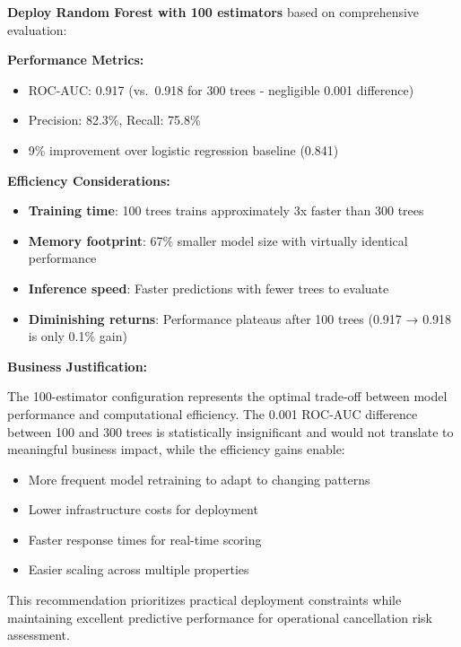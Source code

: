 \documentclass[
  letterpaper,
  DIV=11,
  numbers=noendperiod]{scrartcl}
\providecommand{\tightlist}{%
  \setlength{\itemsep}{0pt}\setlength{\parskip}{0pt}}
\begin{document}
\textbf{Deploy Random Forest with 100 estimators} based on comprehensive
evaluation:

\textbf{Performance Metrics:}

\begin{itemize}
\tightlist
\item
  ROC-AUC: 0.917 (vs.~0.918 for 300 trees - negligible 0.001 difference)
\item
  Precision: 82.3\%, Recall: 75.8\%
\item
  9\% improvement over logistic regression baseline (0.841)
\end{itemize}

\textbf{Efficiency Considerations:}

\begin{itemize}
\tightlist
\item
  \textbf{Training time}: 100 trees trains approximately 3x faster than
  300 trees
\item
  \textbf{Memory footprint}: 67\% smaller model size with virtually
  identical performance
\item
  \textbf{Inference speed}: Faster predictions with fewer trees to
  evaluate
\item
  \textbf{Diminishing returns}: Performance plateaus after 100 trees
  (0.917 → 0.918 is only 0.1\% gain)
\end{itemize}

\textbf{Business Justification:}

The 100-estimator configuration represents the optimal trade-off between
model performance and computational efficiency. The 0.001 ROC-AUC
difference between 100 and 300 trees is statistically insignificant and
would not translate to meaningful business impact, while the efficiency
gains enable:

\begin{itemize}
\tightlist
\item
  More frequent model retraining to adapt to changing patterns
\item
  Lower infrastructure costs for deployment
\item
  Faster response times for real-time scoring
\item
  Easier scaling across multiple properties
\end{itemize}

This recommendation prioritizes practical deployment constraints while
maintaining excellent predictive performance for operational
cancellation risk assessment.
\end{document}
